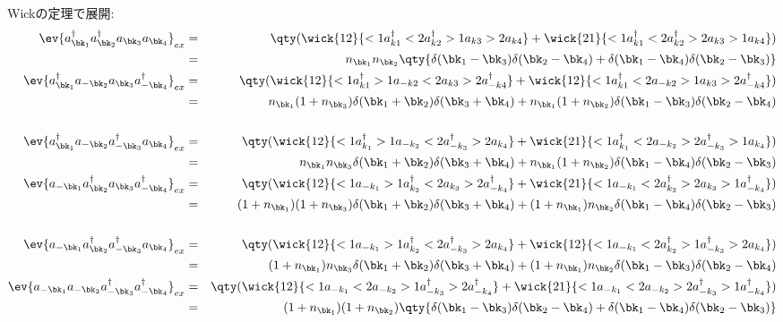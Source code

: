 \documentclass[10.5pt,a4paper]{jreport}
\begin{document}
Wickの定理で展開:
\begin{eqnarray}
  \nonumber  \ev{a^\dagger_{\bk_1}a^\dagger_{\bk_2}a_{\bk_3}a_{\bk_4}}_{ex} &=& \qty(\wick{12}{<1a^\dagger_{k1}<2a^\dagger_{k2}>1a_{k3}>2a_{k4}} + \wick{21}{<1a^\dagger_{k1}<2a^\dagger_{k2}>2a_{k3}>1a_{k4}})\\
  &=& n_{\bk_1}n_{\bk_2}\qty{\delta(\bk_1 - \bk_3)\delta(\bk_2 - \bk_4) + \delta(\bk_1 - \bk_4)\delta(\bk_2 - \bk_3)}\\
  \nonumber  \ev{a^\dagger_{\bk_1}a_{-\bk_2}a_{\bk_3}a^\dagger_{-\bk_4}}_{ex} &=& \qty(\wick{12}{<1a^\dagger_{k1}>1a_{-k2}<2a_{k3}>2a^\dagger_{-k4}} + \wick{12}{<1a^\dagger_{k1}<2a_{-k2}>1a_{k3}>2a^\dagger_{-k4}})\\
  \nonumber&=& n_{\bk_1}(1 + n_{\bk_3})\delta(\bk_1 + \bk_2)\delta(\bk_3 + \bk_4) + n_{\bk_1}(1 + n_{\bk_2})\delta(\bk_1 - \bk_3)\delta(\bk_2 - \bk_4)\\
  \\
  \nonumber  \ev{a^\dagger_{\bk_1}a_{-\bk_2}a^\dagger_{-\bk_3}a_{\bk_4}}_{ex} &=& \qty(\wick{12}{ <1a^\dagger_{k_1}>1a_{-k_2}<2a^\dagger_{-k_3}>2a_{k_4}} + \wick{21}{<1a^\dagger_{k_1}<2a_{-k_2}>2a^\dagger_{-k_3}>1a_{k_4}})\\
  &=& n_{\bk_1}n_{\bk_3}\delta(\bk_1 + \bk_2)\delta(\bk_3 + \bk_4) + n_{\bk_1}(1 + n_{\bk_2})\delta(\bk_1 - \bk_4)\delta(\bk_2 - \bk_3)\\
  \nonumber  \ev{a_{-\bk_1}a^\dagger_{\bk_2}a_{\bk_3}a^\dagger_{-\bk_4}}_{ex} &=& \qty(\wick{12}{<1a_{-k_1}>1a^\dagger_{k_2}<2a_{k_3}>2a^\dagger_{-k_4}} + \wick{21}{<1a_{-k_1}<2a^\dagger_{k_2}>2a_{k_3}>1a^\dagger_{-k_4}})\\
  \nonumber&=& (1+n_{\bk_1})(1+n_{\bk_3})\delta(\bk_1 + \bk_2)\delta(\bk_3 + \bk_4) + (1+n_{\bk_1})n_{\bk_2}\delta(\bk_1 - \bk_4)\delta(\bk_2 - \bk_3)\\
  \\
  \nonumber  \ev{a_{-\bk_1}a^\dagger_{\bk_2}a^\dagger_{-\bk_3}a_{\bk_4}}_{ex} &=& \qty(\wick{12}{<1a_{-k_1}>1a^\dagger_{k_2}<2a^\dagger_{-k_3}>2a_{k_4}} + \wick{12}{<1a_{-k_1}<2a^\dagger_{k_2}>1a^\dagger_{-k_3}>2a_{k_4}})\\
  &=& (1 + n_{\bk_1})n_{\bk_3}\delta(\bk_1 + \bk_2)\delta(\bk_3 + \bk_4) + (1 + n_{\bk_1})n_{\bk_2}\delta(\bk_1 - \bk_3)\delta(\bk_2 - \bk_4)\\
  \nonumber  \ev{a_{-\bk_1}a_{-\bk_2}a^\dagger_{-\bk_3}a^\dagger_{-\bk_4}}_{ex} &=& \qty(\wick{12}{<1a_{-k_1}<2a_{-k_2}>1a^\dagger_{-k_3}>2a^\dagger_{-k_4}} + \wick{21}{<1a_{-k_1}<2a_{-k_2}>2a^\dagger_{-k_3}>1a^\dagger_{-k_4}})\\
  &=& (1 + n_{\bk_1})(1 + n_{\bk_2})\qty{\delta(\bk_1 - \bk_3)\delta(\bk_2 - \bk_4) + \delta(\bk_1 - \bk_4)\delta(\bk_2 - \bk_3)}
\end{eqnarray}
\end{document}

